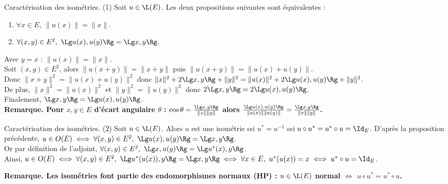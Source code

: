 \documentclass[11pt]{article}
\begin{document}
\begin{thm}{Caractérisation des isométries. (1)}{}
    Soit $u\in\L(E)$. Les deux propositions suivantes sont équivalentes :
    \begin{enumerate}
        \item $\forall x \in E, ~ \|u(x)\|=\|x\|$.
        \item $\forall (x,y) \in E^2, ~ \Lg u(x), u(y)\Rg = \Lg x,y\Rg$.
    \end{enumerate}
    \tcblower
     Avec $y=x$ : $\|u(x)\|=\|x\|$.\\
     Soit $(x,y)\in E^2$, alors $\|u(x+y)\|=\|x+y\|$ puis $\|u(x+y)\|=\|u(x)+u(y)\|$.\\
    Donc $\|x+y\|^2=\|u(x)+u(y)\|^2$ donc $\|x\|^2+2\Lg x,y\Rg + \|y\|^2=\|u(x)\|^2+2\Lg u(x),u(y)\Rg+\|y\|^2$.\\
    De plus, $\|x\|^2=\|u(x)\|^2$ et $\|y\|^2=\|u(y)\|^2$ donc $2\Lg x,y\Rg = 2\Lg u(x), u(y)\Rg$.\\
    Finalement, $\Lg x,y \Rg = \Lg u(x), u(y)\Rg$.\\
    \bf{Remarque.} Pour $x,y\in E$ d'écart angulaire $\theta$ : $\cos\theta=\frac{\Lg x,y \Rg}{\|x\|\|y\|}$ alors $\frac{\Lg u(x),u(y)\Rg}{\|u(x)\|\|u(y)\|}=\frac{\Lg x,y\Rg}{\|x\|\|y\|}$.
\end{thm}

\vspace*{-0.8cm}

\begin{thm}{Caractérisation des isométries. (2)}{}
    Soit $u\in \L(E)$. Alors $u$ est une isométrie ssi $u^* = u^{-1}$ ssi $u\circ u^* = u^* \circ u = \Id_E$.
    \tcblower
    D'après la proposition précédente, $u\in O(E)\iff \forall (x,y) \in E^2, ~ \Lg u(x),u(y)\Rg=\Lg x,y\Rg$.\\
    Or par définition de l'adjoint, $\forall (x,y)\in E^2, ~ \Lg x,u(y)\Rg = \Lg u^*(x),y\Rg$.\\
    Ainsi, $u\in O(E) \iff \forall (x,y)\in E^2, ~ \Lg u^*(u(x)), y \Rg = \Lg x,y\Rg \iff \forall x \in E, ~ u^*(u(x))=x \iff u^*\circ u = \Id_E$.
\end{thm}

\vspace*{-0.8cm}

\bf{Remarque.} Les isométries font partie des endomorphismes normaux (HP) : $u\in\L(E)$ normal $\iff$ $u\circ u^* = u^* \circ u$.
\end{document}
